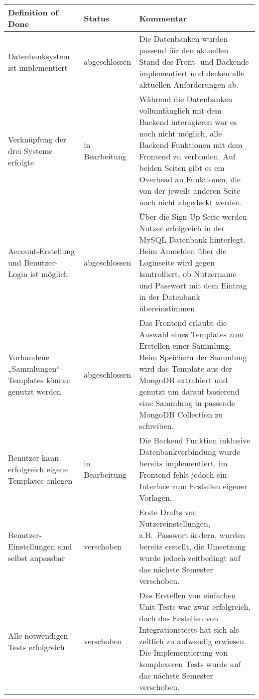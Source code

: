 \begin{table}[h!]
    \centering
    \renewcommand{\arraystretch}{1.5}
    \begin{tabular}{|p{}|p{}|p{}|}
        \hline
        \textbf{Definition of Done} & \textbf{Status} & \textbf{Kommentar} \\
        \hline
        Datenbanksystem ist implementiert & abgeschlossen & Die Datenbanken wurden passend für den aktuellen Stand des Front- und Backends implementiert und decken alle aktuellen Anforderungen ab. \\
        \hline
        Verknüpfung der drei Systeme erfolgte & in Bearbeitung & Während die Datenbanken vollumfänglich mit dem Backend interagieren war es noch nicht möglich, alle Backend Funktionen mit dem Frontend zu verbinden.
        Auf beiden Seiten gibt es ein Overhead an Funktionen, die von der jeweils anderen Seite noch nicht abgedeckt werden. \\
        \hline
        Account-Erstellung und Benutzer-Login ist möglich & abgeschlossen &  Über die Sign-Up Seite werden Nutzer erfolgreich in der MySQL Datenbank hinterlegt.
        Beim Anmelden über die Loginseite wird gegen kontrolliert, ob Nutzername und Passwort mit dem Eintrag in der Datenbank übereinstimmen.
        \\
        \hline
        Vorhandene „Sammlungen“-Templates können genutzt werden & abgeschlossen & Das Frontend erlaubt die Auswahl eines Templates zum Erstellen einer Sammlung.
        Beim Speichern der Sammlung wird das Template aus der MongoDB extrahiert und genutzt um darauf basierend eine Sammlung in passende MongoDB Collection zu schreiben.
        \\
        \hline
        Benutzer kann erfolgreich eigene Templates anlegen & in Bearbeitung & Die Backend Funktion inklusive Datenbankverbindung wurde bereits implementiert, im Frontend fehlt jedoch ein Interface zum Erstellen eigener Vorlagen. \\
        \hline
        Benutzer-Einstellungen sind selbst anpassbar & verschoben & Erste Drafts von Nutzereinstellungen, z.B.\ Passwort ändern, wurden bereits erstellt, die Umsetzung wurde jedoch zeitbedingt auf das nächste Semester verschoben. \\
        \hline
        Alle notwendigen Tests erfolgreich & verschoben & Das Erstellen von einfachen Unit-Tests war zwar erfolgreich, doch das Erstellen von Integrationstests hat sich als zeitlich zu aufwendig erwiesen.
        Die Implementierung von komplexeren Tests wurde auf das nächste Semester verschoben. \\
        \hline
    \end{tabular}
    \label{tab:definition-of-done-vergleich_2}
\end{table}
\newpage
